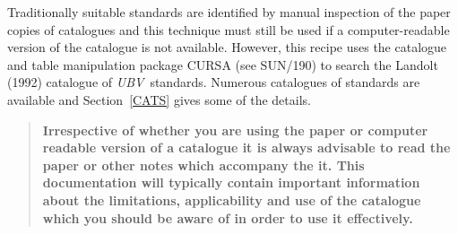 \documentclass[twoside,11pt]{article}
\newcommand{\xref}[3]{#1}
\begin{document}
Traditionally suitable standards are identified by manual inspection
of the paper copies of catalogues and this technique must still be used
if a computer-readable version of the catalogue is not available.
However, this recipe uses the catalogue and table manipulation package
CURSA (see \xref{SUN/190}{sun190}{}\cite{SUN190}) to search the
Landolt (1992)\cite{LANDOLT92} catalogue of {\it UBV}\, standards.
Numerous catalogues of standards are available and Section~\ref{CATS}
gives some of the details.

\begin{quote}
{\bf Irrespective of whether you are using the paper or computer
readable version of a catalogue it is always advisable to read the
paper or other notes which accompany the it.  This documentation will
typically contain important information about the limitations,
applicability and use of the catalogue which you should be aware of
in order to use it effectively.}
\end{quote}
\end{document}
